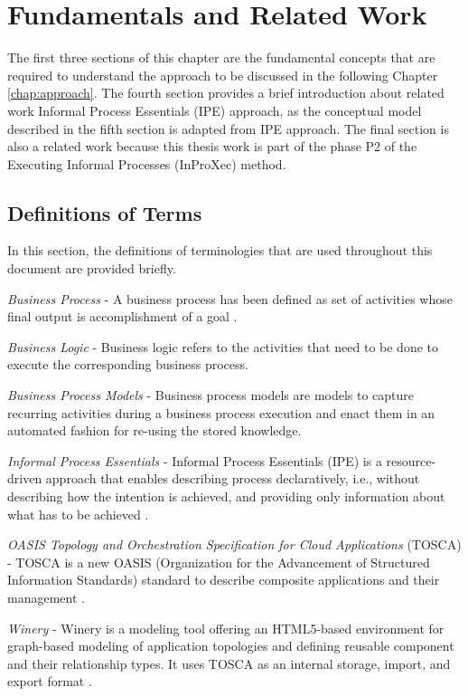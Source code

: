 \chapter{Fundamentals and Related Work}
\label{chap:fundamentals}
The first three sections of this chapter are the fundamental concepts that are required to understand the approach to be discussed in the following Chapter \ref{chap:approach}. The fourth section provides a brief introduction about related work Informal Process Essentials (IPE) approach, as the conceptual model described in the fifth section is adapted from IPE approach. The final section is also a related work because this thesis work is part of the phase P2 of the Executing Informal Processes (InProXec) method.

\section{Definitions of Terms}
\label{sec:termdefinitions}
In this section, the definitions of terminologies that are used throughout this document are provided briefly.

\textit{Business Process} -  A business process has been defined as set of activities whose final output is accomplishment of a goal \cite{Weske2012}.  

\textit{Business Logic} - Business logic refers to the activities that need to be done to execute the corresponding business process. 

\textit{Business Process Models} - Business process models are models to capture recurring activities during a business process execution and enact them in an automated fashion for re-using the stored knowledge. 

\textit{Informal Process Essentials} - Informal Process Essentials (IPE) is a resource-driven approach that enables describing process declaratively, i.e., without describing how the intention is achieved, and providing only information about what has to be achieved \cite{Sungur2014a}. 

\textit{OASIS Topology and Orchestration Specification for Cloud Applications} (TOSCA) - TOSCA  is  a  new  OASIS (Organization for the Advancement of Structured Information Standards) standard to describe composite applications and their management \cite{Kopp2013}.  

\textit{Winery} - Winery is a modeling tool offering an HTML5-based environment for graph-based modeling of application topologies and defining reusable component and their relationship types. It uses TOSCA as an internal storage, import, and export format \cite{Kopp2013}. 

